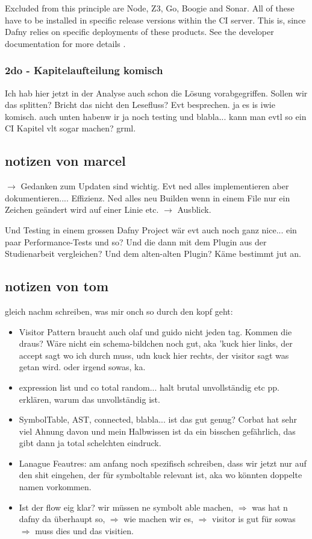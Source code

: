 Excluded from this principle are Node, Z3, Go, Boogie and Sonar. All of these have to be installed in specific release versions within the CI server. This is, since Dafny relies on specific deployments of these products. See the developer documentation for more details \cite{dev}. \\

\subsubsection{2do - Kapitelaufteilung komisch}
Ich hab hier jetzt in der Analyse auch schon die Lösung vorabgegriffen. Sollen wir das splitten? Bricht das nicht den Lesefluss? Evt besprechen.
ja es is iwie komisch. auch unten habenw ir ja noch testing und blabla... kann man evtl so ein CI Kapitel vlt sogar machen? grml.



\subsection{notizen von marcel}

$\rightarrow$ Gedanken zum Updaten sind wichtig. Evt ned alles implementieren aber dokumentieren.... Effizienz. Ned alles neu Builden
wenn in einem File nur ein Zeichen geändert wird auf einer Linie etc. $\rightarrow$ Ausblick.

Und Testing in einem grossen Dafny Project wär evt auch noch ganz nice... ein paar Performance-Tests und so?
Und die dann mit dem Plugin aus der Studienarbeit vergleichen? Und dem alten-alten Plugin? Käme bestimmt jut an.


\subsection{notizen von tom}
gleich nachm schreiben, was mir onch so durch den kopf geht:
\begin{itemize}
    \item Visitor Pattern braucht auch olaf und guido nicht jeden tag. Kommen die draus? Wäre nicht ein schema-bildchen noch gut, aka 'kuck hier links, der accept sagt wo ich durch muss, udn kuck hier rechts, der visitor sagt was getan wird. oder irgend sowas, ka.
    \item expression list und co total random... halt brutal unvollständig etc pp. erklären, warum das unvollständig ist.
    \item SymbolTable, AST, connected, blabla... ist das gut genug? Corbat hat sehr viel Ahnung davon und mein Halbwissen ist da ein bisschen gefährlich, das gibt dann ja total schelchten eindruck.
    \item Lanague Feautres: am anfang noch spezifisch schreiben, dass wir jetzt nur auf den shit eingehen, der für symboltable relevant ist, aka wo könnten doppelte namen vorkommen.
    \item Ist der flow eig klar? wir müssen ne symbolt able machen, $\Rightarrow$ was hat n dafny da überhaupt so, $\Rightarrow$ wie machen wir es, $\Rightarrow$ visitor is gut für sowas $\Rightarrow$ muss dies und das visitien.
\end{itemize}
